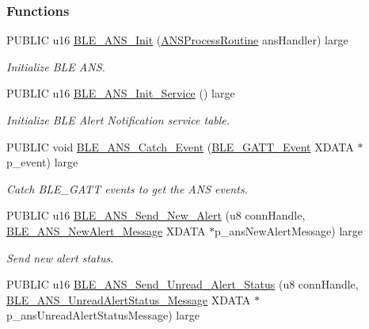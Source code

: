 \subsubsection*{Functions}
\begin{DoxyCompactItemize}
\item 
P\+U\+B\+L\+IC u16 \hyperlink{group___b_l_e___a_n_s_ga61c8e77a1c1bc963860a50fd8c432209}{B\+L\+E\+\_\+\+A\+N\+S\+\_\+\+Init} (\hyperlink{group___b_l_e___a_n_s_ga1e3c95d8f99910c134671407f9f3cd2a}{A\+N\+S\+Process\+Routine} ans\+Handler) large
\begin{DoxyCompactList}\small\item\em Initialize B\+LE A\+NS. \end{DoxyCompactList}\item 
P\+U\+B\+L\+IC u16 \hyperlink{group___b_l_e___a_n_s_ga6424d11ab75b05bdb8d6ebec7a218d71}{B\+L\+E\+\_\+\+A\+N\+S\+\_\+\+Init\+\_\+\+Service} () large
\begin{DoxyCompactList}\small\item\em Initialize B\+LE Alert Notification service table. \end{DoxyCompactList}\item 
P\+U\+B\+L\+IC void \hyperlink{group___b_l_e___a_n_s_gaa7823cb45826351b92af25d1f0dfbd1b}{B\+L\+E\+\_\+\+A\+N\+S\+\_\+\+Catch\+\_\+\+Event} (\hyperlink{struct_b_l_e___g_a_t_t___event}{B\+L\+E\+\_\+\+G\+A\+T\+T\+\_\+\+Event} X\+D\+A\+TA $\ast$p\+\_\+event) large
\begin{DoxyCompactList}\small\item\em Catch B\+L\+E\+\_\+\+G\+A\+TT events to get the A\+NS events. \end{DoxyCompactList}\item 
P\+U\+B\+L\+IC u16 \hyperlink{group___b_l_e___a_n_s_gac5b4e2bc46bad84b2c4b184437927ae1}{B\+L\+E\+\_\+\+A\+N\+S\+\_\+\+Send\+\_\+\+New\+\_\+\+Alert} (u8 conn\+Handle, \hyperlink{struct_b_l_e___a_n_s___new_alert___message}{B\+L\+E\+\_\+\+A\+N\+S\+\_\+\+New\+Alert\+\_\+\+Message} X\+D\+A\+TA $\ast$p\+\_\+ans\+New\+Alert\+Message) large
\begin{DoxyCompactList}\small\item\em Send new alert status. \end{DoxyCompactList}\item 
P\+U\+B\+L\+IC u16 \hyperlink{group___b_l_e___a_n_s_ga12d36228c3f580967914f6ffa6876170}{B\+L\+E\+\_\+\+A\+N\+S\+\_\+\+Send\+\_\+\+Unread\+\_\+\+Alert\+\_\+\+Status} (u8 conn\+Handle, \hyperlink{struct_b_l_e___a_n_s___unread_alert_status___message}{B\+L\+E\+\_\+\+A\+N\+S\+\_\+\+Unread\+Alert\+Status\+\_\+\+Message} X\+D\+A\+TA $\ast$p\+\_\+ans\+Unread\+Alert\+Status\+Message) large

\end{DoxyCompactItemize}

